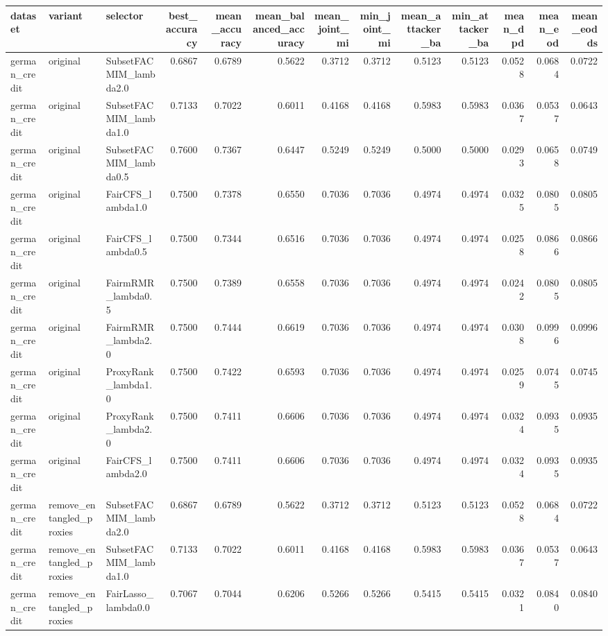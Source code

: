 \begin{tabular}{lllrrrrrrrrrr}
\toprule
dataset & variant & selector & best_accuracy & mean_accuracy & mean_balanced_accuracy & mean_joint_mi & min_joint_mi & mean_attacker_ba & min_attacker_ba & mean_dpd & mean_eod & mean_eodds \\
\midrule
german_credit & original & SubsetFACMIM_lambda2.0 & 0.6867 & 0.6789 & 0.5622 & 0.3712 & 0.3712 & 0.5123 & 0.5123 & 0.0528 & 0.0684 & 0.0722 \\
german_credit & original & SubsetFACMIM_lambda1.0 & 0.7133 & 0.7022 & 0.6011 & 0.4168 & 0.4168 & 0.5983 & 0.5983 & 0.0367 & 0.0537 & 0.0643 \\
german_credit & original & SubsetFACMIM_lambda0.5 & 0.7600 & 0.7367 & 0.6447 & 0.5249 & 0.5249 & 0.5000 & 0.5000 & 0.0293 & 0.0658 & 0.0749 \\
german_credit & original & FairCFS_lambda1.0 & 0.7500 & 0.7378 & 0.6550 & 0.7036 & 0.7036 & 0.4974 & 0.4974 & 0.0325 & 0.0805 & 0.0805 \\
german_credit & original & FairCFS_lambda0.5 & 0.7500 & 0.7344 & 0.6516 & 0.7036 & 0.7036 & 0.4974 & 0.4974 & 0.0258 & 0.0866 & 0.0866 \\
german_credit & original & FairmRMR_lambda0.5 & 0.7500 & 0.7389 & 0.6558 & 0.7036 & 0.7036 & 0.4974 & 0.4974 & 0.0242 & 0.0805 & 0.0805 \\
german_credit & original & FairmRMR_lambda2.0 & 0.7500 & 0.7444 & 0.6619 & 0.7036 & 0.7036 & 0.4974 & 0.4974 & 0.0308 & 0.0996 & 0.0996 \\
german_credit & original & ProxyRank_lambda1.0 & 0.7500 & 0.7422 & 0.6593 & 0.7036 & 0.7036 & 0.4974 & 0.4974 & 0.0259 & 0.0745 & 0.0745 \\
german_credit & original & ProxyRank_lambda2.0 & 0.7500 & 0.7411 & 0.6606 & 0.7036 & 0.7036 & 0.4974 & 0.4974 & 0.0324 & 0.0935 & 0.0935 \\
german_credit & original & FairCFS_lambda2.0 & 0.7500 & 0.7411 & 0.6606 & 0.7036 & 0.7036 & 0.4974 & 0.4974 & 0.0324 & 0.0935 & 0.0935 \\
german_credit & remove_entangled_proxies & SubsetFACMIM_lambda2.0 & 0.6867 & 0.6789 & 0.5622 & 0.3712 & 0.3712 & 0.5123 & 0.5123 & 0.0528 & 0.0684 & 0.0722 \\
german_credit & remove_entangled_proxies & SubsetFACMIM_lambda1.0 & 0.7133 & 0.7022 & 0.6011 & 0.4168 & 0.4168 & 0.5983 & 0.5983 & 0.0367 & 0.0537 & 0.0643 \\
german_credit & remove_entangled_proxies & FairLasso_lambda0.0 & 0.7067 & 0.7044 & 0.6206 & 0.5266 & 0.5266 & 0.5415 & 0.5415 & 0.0321 & 0.0840 & 0.0840 \\

\end{tabular}

